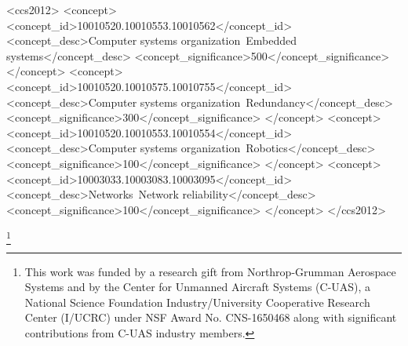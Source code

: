 \documentclass[format=manuscript]{acmart}
\begin{document}
%
%
\begin{CCSXML}
<ccs2012>
 <concept>
  <concept_id>10010520.10010553.10010562</concept_id>
  <concept_desc>Computer systems organization~Embedded systems</concept_desc>
  <concept_significance>500</concept_significance>
 </concept>
 <concept>
  <concept_id>10010520.10010575.10010755</concept_id>
  <concept_desc>Computer systems organization~Redundancy</concept_desc>
  <concept_significance>300</concept_significance>
 </concept>
 <concept>
  <concept_id>10010520.10010553.10010554</concept_id>
  <concept_desc>Computer systems organization~Robotics</concept_desc>
  <concept_significance>100</concept_significance>
 </concept>
 <concept>
  <concept_id>10003033.10003083.10003095</concept_id>
  <concept_desc>Networks~Network reliability</concept_desc>
  <concept_significance>100</concept_significance>
 </concept>
</ccs2012>  
\end{CCSXML}


%
%



\thanks{This work was funded by a research gift from Northrop-Grumman Aerospace Systems and by the Center for Unmanned Aircraft Systems (C-UAS), a National Science Foundation Industry/University Cooperative Research Center (I/UCRC) under NSF Award No. CNS-1650468 along with significant contributions from C-UAS industry members.}


\maketitle

% 
% 








\end{document}
